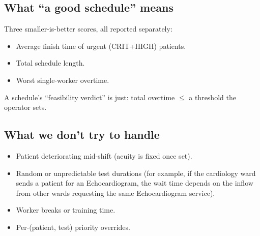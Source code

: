 \subsection{What ``a good schedule'' means}

Three smaller-is-better scores, all reported separately:

\begin{itemize}
  \item Average finish time of urgent (CRIT+HIGH) patients.
  \item Total schedule length.
  \item Worst single-worker overtime.
\end{itemize}

\noindent
A schedule's ``feasibility verdict'' is just: total overtime
$\leq$ a threshold the operator sets.

\subsection{What we don't try to handle}

\begin{itemize}
  \item Patient deteriorating mid-shift (acuity is fixed once set).
  \item Random or unpredictable test durations (for example, if
        the cardiology ward sends a patient for an Echocardiogram,
        the wait time depends on the inflow from other wards
        requesting the same Echocardiogram service).
  \item Worker breaks or training time.
  \item Per-(patient, test) priority overrides.
\end{itemize}
